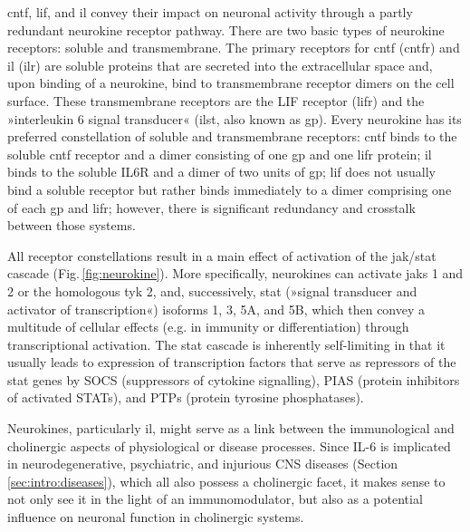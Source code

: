 \ac{cntf}, \ac{lif}, and \ac{il} convey their impact on neuronal activity through a partly redundant neurokine receptor pathway\cite{Berger2014}. There are two basic types of neurokine receptors: soluble and transmembrane. The primary receptors for \ac{cntf} (\acs{cntfr}) and \ac{il} (\acs{ilr}) are soluble proteins that are secreted into the extracellular space and, upon binding of a neurokine, bind to transmembrane receptor dimers on the cell surface. These transmembrane receptors are the LIF receptor (\acs{lifr}) and the »interleukin 6 signal transducer« (\acs{ilst}, also known as \acs{gp}). Every neurokine has its preferred constellation of soluble and transmembrane receptors: \ac{cntf} binds to the soluble \ac{cntf} receptor and a dimer consisting of one \ac{gp} and one \ac{lifr} protein; \ac{il} binds to the soluble IL6R and a dimer of two units of \ac{gp}; \ac{lif} does not usually bind a soluble receptor but rather binds immediately to a dimer comprising one of each \ac{gp} and \ac{lifr}; however, there is significant redundancy and crosstalk between those systems\cite{Rawlings2004,Nathanson2012}.

All receptor constellations result in a main effect of activation of the \acs{jak}/\acs{stat} cascade (Fig.\,\ref{fig:neurokine}). More specifically, neurokines can activate \acfp{jak} 1 and 2 or the homologous \ac{tyk} 2, and, successively, \ac{stat} (»signal transducer and activator of transcription«) isoforms 1, 3, 5A, and 5B, which then convey a multitude of cellular effects (e.g. in immunity or differentiation) through transcriptional activation. The \ac{stat} cascade is inherently self-limiting in that it usually leads to expression of transcription factors that serve as repressors of the \ac{stat} genes by SOCS (suppressors of cytokine signalling), PIAS (protein inhibitors of activated STATs), and PTPs (protein tyrosine phosphatases)\cite{Rawlings2004}. 

Neurokines, particularly \ac{il}, might serve as a link between the immunological and cholinergic aspects of physiological or disease processes. Since IL-6 is implicated in neurodegenerative, psychiatric, and injurious CNS diseases (Section \ref{sec:intro:diseases}), which all also possess a cholinergic facet, it makes sense to not only see it in the light of an immunomodulator, but also as a potential influence on neuronal function in cholinergic systems.

